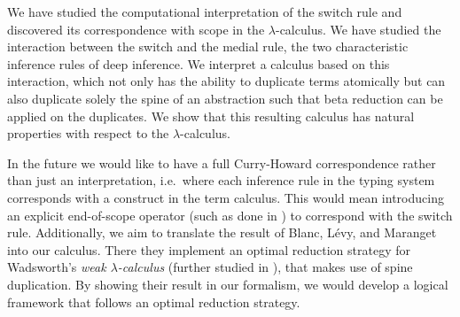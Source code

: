 \documentclass[a4paper,UKenglish,cleveref, autoref]{lipics-v2019}
\begin{document}
We have studied the computational interpretation of the switch rule and discovered its correspondence with scope in the $\lambda$-calculus. We have studied the interaction between the switch and the medial rule, the two characteristic inference rules of deep inference. We interpret a calculus based on this interaction, which not only has the ability to duplicate terms atomically but can also duplicate solely the spine of an abstraction such that beta reduction can be applied on the duplicates. We show that this resulting calculus has natural properties with respect to the $\lambda$-calculus. 

In the future we would like to have a full Curry-Howard correspondence rather than just an interpretation, i.e.\ where each inference rule in the typing system corresponds with a construct in the term calculus. This would mean introducing an explicit end-of-scope operator (such as done in \cite{berkling1976symmetric, hendriks2003lambda, fernandez2005lambda}) to correspond with the switch rule. %
Additionally, we aim to translate the result of Blanc, L\'{e}vy, and Maranget \cite{blanc2007sharing} into our calculus. There they implement an optimal reduction strategy for Wadsworth's \emph{weak $\lambda$-calculus} \cite{wadsworth1971semantics} (further studied in \cite{CAGMAN1998239}), that makes use of spine duplication. By showing their result in our formalism, we would develop a logical framework that follows an optimal reduction strategy.




\end{document}
